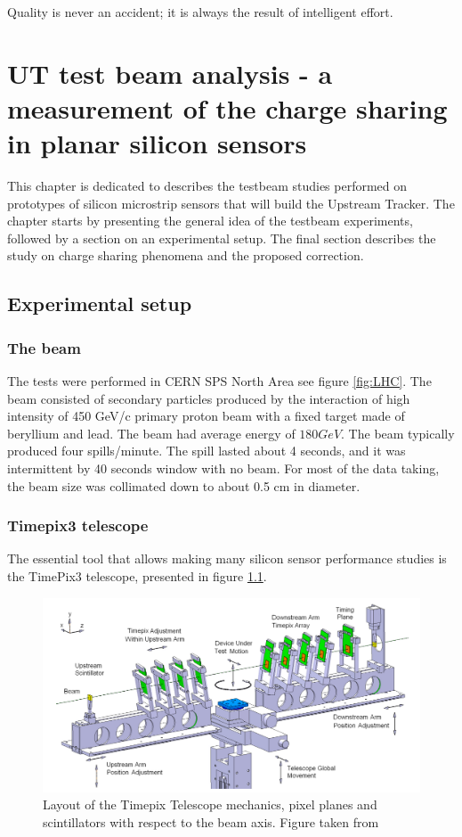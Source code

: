 \begin{savequote}[75mm] 
Quality is never an accident; it is always the result of intelligent effort. 
\end{savequote}


\chapter{UT test beam analysis - a measurement of the charge sharing
in planar silicon sensors}
\label{chapter:testbeam}

This chapter is dedicated to describes the testbeam studies performed on prototypes of silicon microstrip sensors that will build the Upstream Tracker.  The chapter starts by presenting the general idea of the testbeam experiments, followed by a section on an experimental setup. The final section describes the study on charge sharing phenomena and the proposed correction. 

\section{Experimental setup}

\subsection{The beam}
The tests were performed in CERN SPS North Area see figure \ref{fig:LHC}. The beam consisted of secondary particles produced by the interaction of high intensity of 450 GeV/c primary proton beam with a fixed target made of beryllium and lead. The beam had average energy of $180 GeV$.  
The beam typically produced four spills/minute. The spill lasted about 4 seconds, and it was intermittent by 40 seconds window with no beam. For most of the data taking, the beam size was collimated down to about 0.5 cm in diameter.

\subsection{Timepix3 telescope}
The essential tool that allows making many silicon sensor performance studies is the TimePix3 telescope, presented in figure \ref{fig:telescope}. 


\begin{figure}[!h]
\centering
\includegraphics{figures/telescope.png}
\caption{Layout of the Timepix Telescope mechanics, pixel planes and scintillators with respect to the beam axis. Figure taken from \cite{telescope}}
\label{fig:telescope}
\end{figure}


